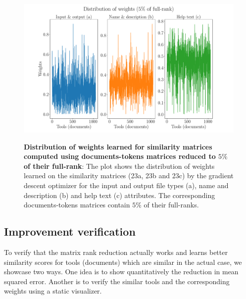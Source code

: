 \begin{figure}[h]
\begin{centering}
    {\includegraphics[scale=0.37]{figures/Weights_005.pdf}}
    \caption[Distribution of weights learned for similarity matrices computed using documents-tokens matrices reduced to $5\%$ of their full-rank]{\textbf{Distribution of weights learned for similarity matrices computed using documents-tokens matrices reduced to $5\%$ of their full-rank}: The plot shows the distribution of weights learned on the similarity matrices (23a, 23b and 23c) by the gradient descent optimizer for the input and output file types (a), name and description (b) and help text (c) attributes. The corresponding documents-tokens matrices contain $5\%$ of their full-ranks.}
\end{centering}
\end{figure}

\subsection{Improvement verification}
To verify that the matrix rank reduction actually works and learns better similarity scores for tools (documents) which are similar in the actual case, we showcase two ways. One idea is to show quantitatively the reduction in mean squared error. Another is to verify the similar tools and the corresponding weights using a static visualizer.

